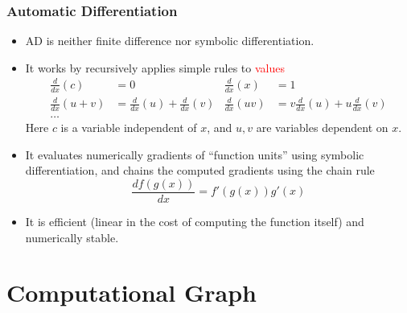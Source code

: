 \documentclass{beamer}
\begin{document}
\begin{frame}
	\frametitle{Automatic Differentiation}
	
	\begin{itemize}
		\item AD is neither finite difference nor symbolic differentiation. 
		 \item It works by recursively applies simple rules to \textcolor{red}{values}
		\begin{align*}
			\frac{d}{dx}(c) &= 0  & \frac{d}{dx}(x) &= 1\\
			\frac{d}{dx}(u+v) &= \frac{d}{dx}(u) + \frac{d}{dx}(v) & \frac{d}{dx}(uv) &= v\frac{d}{dx}(u)+u\frac{d}{dx}(v)\\
			\ldots
		\end{align*}
		Here $c$ is a variable independent of $x$, and $u, v$ are variables dependent on $x$.
		
		\item It evaluates numerically gradients of ``function units'' using symbolic differentiation, and chains the computed gradients using the chain rule
		$$\frac{df(g(x))}{dx} = f'(g(x)) g'(x)$$
		\item It is efficient (linear in the cost of computing the function itself) and numerically stable.  
	\end{itemize}
	
\end{frame}


\section{Computational Graph}
\end{document}
